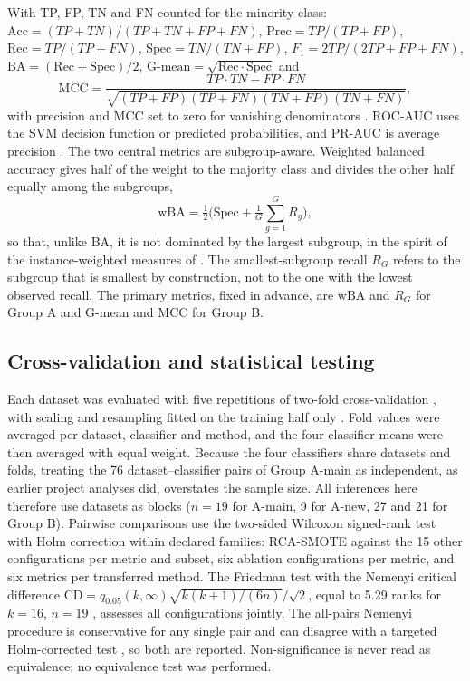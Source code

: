 \documentclass[preprint,nopreprintline]{elsarticle}
\theoremstyle{plain}
\theoremstyle{definition}
\newcommand{\wba}{\mathrm{wBA}}
\newcommand{\rg}{R_{G}}
\begin{document}
With TP, FP, TN and FN counted for the minority class: $\mathrm{Acc}=(TP+TN)/(TP+TN+FP+FN)$, $\mathrm{Prec}=TP/(TP+FP)$, $\mathrm{Rec}=TP/(TP+FN)$, $\mathrm{Spec}=TN/(TN+FP)$, $F_1=2TP/(2TP+FP+FN)$, $\mathrm{BA}=(\mathrm{Rec}+\mathrm{Spec})/2$, $\text{G-mean}=\sqrt{\mathrm{Rec}\cdot\mathrm{Spec}}$ and
\begin{equation}\label{eq:mcc}
\mathrm{MCC}=\frac{TP\cdot TN-FP\cdot FN}{\sqrt{(TP+FP)(TP+FN)(TN+FP)(TN+FN)}},
\end{equation}
with precision and MCC set to zero for vanishing denominators \cite{chicco2020advantages}. ROC-AUC uses the SVM decision function or predicted probabilities, and PR-AUC is average precision \cite{saito2015precision}. The two central metrics are subgroup-aware. Weighted balanced accuracy gives half of the weight to the majority class and divides the other half equally among the subgroups,
\begin{equation}\label{eq:wba}
\wba=\tfrac{1}{2}\bigl(\mathrm{Spec}+\tfrac{1}{G}\textstyle\sum_{g=1}^{G}R_g\bigr),
\end{equation}
so that, unlike BA, it is not dominated by the largest subgroup, in the spirit of the instance-weighted measures of \cite{bellinger2024performance}. The smallest-subgroup recall $\rg$ refers to the subgroup that is smallest by construction, not to the one with the lowest observed recall. The primary metrics, fixed in advance, are $\wba$ and $\rg$ for Group A and G-mean and MCC for Group B.

\subsection{Cross-validation and statistical testing}\label{sec:stats}

Each dataset was evaluated with five repetitions of two-fold cross-validation \cite{dietterich1998approximate}, with scaling and resampling fitted on the training half only \cite{kaufman2012leakage,santos2018cross}. Fold values were averaged per dataset, classifier and method, and the four classifier means were then averaged with equal weight. Because the four classifiers share datasets and folds, treating the 76 dataset--classifier pairs of Group A-main as independent, as earlier project analyses did, overstates the sample size. All inferences here therefore use datasets as blocks ($n=19$ for A-main, 9 for A-new, 27 and 21 for Group B). Pairwise comparisons use the two-sided Wilcoxon signed-rank test \cite{wilcoxon1945individual} with Holm correction \cite{holm1979simple} within declared families: RCA-SMOTE against the 15 other configurations per metric and subset, six ablation configurations per metric, and six metrics per transferred method. The Friedman test \cite{friedman1937use} with the Nemenyi critical difference $\mathrm{CD}=q_{0.05}(k,\infty)\sqrt{k(k+1)/(6n)}/\sqrt{2}$, equal to 5.29 ranks for $k=16$, $n=19$ \cite{demsar2006statistical}, assesses all configurations jointly. The all-pairs Nemenyi procedure is conservative for any single pair and can disagree with a targeted Holm-corrected test \cite{demsar2006statistical}, so both are reported. Non-significance is never read as equivalence; no equivalence test was performed.
\end{document}
